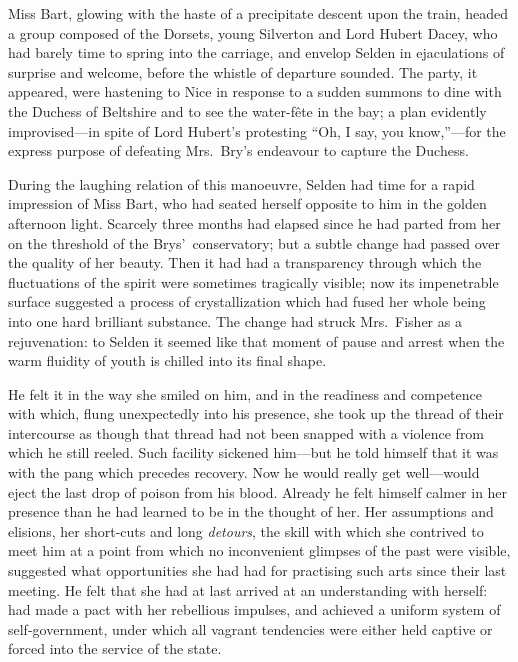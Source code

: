 \documentclass[12pt,a4paper]{book}
\begin{document}
Miss Bart, glowing with the haste of a precipitate descent upon
the train, headed a group composed of the Dorsets, young
Silverton and Lord Hubert Dacey, who had barely time to spring
into the carriage, and envelop Selden in ejaculations of surprise
and welcome, before the whistle of departure sounded. The party,
it appeared, were hastening to Nice in response to a sudden
summons to dine with the Duchess of Beltshire and to see the
water-f\^{e}te in the bay; a plan evidently improvised---in spite of
Lord Hubert's protesting ``Oh, I say, you know,''---for the express
purpose of defeating Mrs.\ Bry's endeavour to capture the Duchess.





During the laughing relation of this manoeuvre, Selden had time
for a rapid impression of Miss Bart, who had seated herself
opposite to him in the golden afternoon light. Scarcely three
months had elapsed since he had parted from her on the threshold
of the Brys'\ conservatory; but a subtle change had passed over
the quality of her beauty. Then it had had a transparency through
which the fluctuations of the spirit were sometimes tragically
visible; now its impenetrable surface suggested a process of
crystallization which had fused her whole being into one hard
brilliant substance. The change had struck Mrs.\ Fisher as
a rejuvenation: to Selden it seemed like that moment of pause and
arrest when the warm fluidity of youth is chilled into its final
shape.





He felt it in the way she smiled on him, and in the readiness and
competence with which, flung unexpectedly into his presence, she
took up the thread of their intercourse as though that thread had
not been snapped with a violence from which he still reeled. Such
facility sickened him---but he told himself that it was with the
pang which precedes recovery. Now he would really get well---would
eject the last drop of poison from his blood. Already he felt
himself calmer in her presence than he had learned to be in the
thought of her. Her assumptions and elisions, her short-cuts and
long \textit{detours}, the skill with which she contrived to meet him at a
point from which no inconvenient glimpses of the past were
visible, suggested what opportunities she had had for practising
such arts since their last meeting. He felt that she had at last
arrived at an understanding with herself: had made a pact with
her rebellious impulses, and achieved a uniform system of
self-government, under which all vagrant tendencies were either
held captive or forced into the service of the state.
\end{document}
